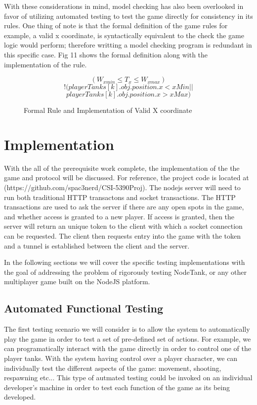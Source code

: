 \documentclass[conference]{IEEEtran}
\begin{document}
With these considerations in mind, model checking has also been overlooked in favor of utilizing automated testing to test the
game directly for consistency in its rules. One thing of note is that the formal definition of the game rules for example, a valid x coordinate,
is syntactically equivalent to the check the game logic would perform; therefore writting a model checking program is redundant in this specific
case. Fig 11 shows the formal definition along with the implementation of the rule.

\begin{figure}[htbp]
\[ (W_{xmin} \leq T_{x} \leq W_{xmax}) \]
\[ !(playerTanks[k].obj.position.x < xMin ||\]
\[ playerTanks[k].obj.position.x > xMax) \]
\caption{Formal Rule and Implementation of Valid X coordinate}
\end{figure}


\section{Implementation}

With the all of the prerequisite work complete, the implementation of the the game and protocol will be discussed. For reference,
the project code is located at (https://github.com/spac3nerd/CSI-5390Proj). The nodejs server
will need to run both traditional HTTP transactons and socket transactions. The HTTP transactions are used to ask the server if
there are any open spots in the game, and whether access is granted to a new player. If access is granted, then the server will return
an unique token to the client with which a socket connection can be requested. The client then requests entry into the game
with the token and a tunnel is established between the client and the server.

In the following sections we will cover the specific testing implementations with the goal of addressing the problem of rigorously testing NodeTank, or any
other multiplayer game built on the NodeJS platform.


\subsection{Automated Functional Testing}

The first testing scenario we will consider is to allow the system to automatically play the game in order to test a set of pre-defined set of actions.
For example, we can programatically interact with the game directly in order to control one of the player tanks. With the system having control over a player character,
we can individually test the different aspects of the game: movement, shooting, respawning etc... This type of autmated testing could be invoked on an individual developer's
machine in order to test each function of the game as its being developed.
\end{document}
